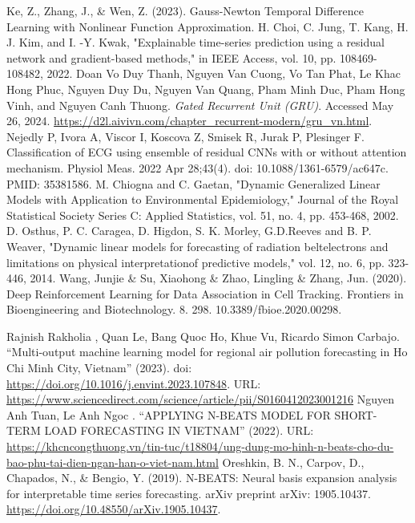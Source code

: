 \documentclass[conference]{IEEEtran}
\begin{document}
\begin{thebibliography}{00}
     Ke, Z., Zhang, J., \& Wen, Z. (2023). Gauss-Newton Temporal Difference Learning with Nonlinear Function Approximation.
     H. Choi, C. Jung, T. Kang, H. J. Kim, and I. -Y. Kwak, "Explainable time-series prediction using a residual network and gradient-based methods," in IEEE Access, vol. 10, pp. 108469-108482, 2022.
     Doan Vo Duy Thanh, Nguyen Van Cuong, Vo Tan Phat, Le Khac Hong Phuc, Nguyen Duy Du, Nguyen Van Quang, Pham Minh Duc, Pham Hong Vinh, and Nguyen Canh Thuong. \textit{Gated Recurrent Unit (GRU)}. Accessed May 26, 2024. \url{https://d2l.aivivn.com/chapter_recurrent-modern/gru_vn.html}.
     Nejedly P, Ivora A, Viscor I, Koscova Z, Smisek R, Jurak P, Plesinger F. Classification of ECG using ensemble of residual CNNs with or without attention mechanism. Physiol Meas. 2022 Apr 28;43(4). doi: 10.1088/1361-6579/ac647c. PMID: 35381586.
     M. Chiogna and C. Gaetan, "Dynamic Generalized Linear Models with Application to Environmental Epidemiology," Journal of the Royal Statistical Society Series C: Applied Statistics, vol. 51, no. 4, pp. 453-468, 2002.
     D. Osthus, P. C. Caragea, D. Higdon, S. K. Morley, G.D.Reeves and B. P. Weaver, "Dynamic linear models for forecasting of radiation beltelectrons and limitations on physical interpretationof predictive models," vol. 12, no. 6, pp. 323-446, 2014.
     Wang, Junjie \& Su, Xiaohong \& Zhao, Lingling \& Zhang, Jun. (2020). Deep Reinforcement Learning for Data Association in Cell Tracking. Frontiers in Bioengineering and Biotechnology. 8. 298. 10.3389/fbioe.2020.00298.

     Rajnish Rakholia , Quan Le, Bang Quoc Ho, Khue Vu, Ricardo Simon Carbajo. “Multi-output machine learning model for regional air pollution forecasting in Ho Chi Minh City, Vietnam” (2023). doi: \url{https://doi.org/10.1016/j.envint.2023.107848}. URL: \url{https://www.sciencedirect.com/science/article/pii/S0160412023001216}
     Nguyen Anh Tuan, Le Anh Ngoc . “APPLYING N-BEATS MODEL FOR SHORT-TERM LOAD FORECASTING IN VIETNAM” (2022). URL: \url{https://khcncongthuong.vn/tin-tuc/t18804/ung-dung-mo-hinh-n-beats-cho-du-bao-phu-tai-dien-ngan-han-o-viet-nam.html}
     Oreshkin, B. N., Carpov, D., Chapados, N., \& Bengio, Y. (2019). N-BEATS: Neural basis expansion analysis for interpretable time series forecasting. arXiv preprint arXiv: 1905.10437. \url{https://doi.org/10.48550/arXiv.1905.10437}.

\end{thebibliography}
\end{document}

